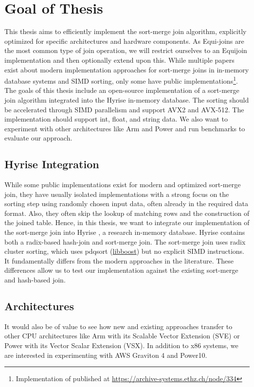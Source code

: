\section{Goal of Thesis}
\label{sec:goal}

This thesis aims to efficiently implement the sort-merge join algorithm, explicitly optimized 
for specific architectures and hardware components. As Equi-joins are the most common type of 
join operation, we will restrict ourselves to an Equijoin implementation and then optionally
extend upon this. While multiple papers exist about modern implementation approaches for
sort-merge joins in in-memory database systems and SIMD sorting, only some have public 
implementations\footnote{Implementation of \cite{Balkesen} published at \url{https://archive-systems.ethz.ch/node/334}}.
The goals of this thesis include an open-source implementation of a sort-merge join algorithm
integrated into the Hyrise in-memory database. The sorting should be accelerated through SIMD
parallelism and support AVX2 and AVX-512. The implementation should support int, float, and string
data. We also want to experiment with other architectures like Arm and Power and run benchmarks 
to evaluate our approach.

\subsection{Hyrise Integration}
While some public implementations
exist for modern and optimized sort-merge join, they have usually isolated implementations with a strong
focus on the sorting step using randomly chosen input data, often already in the required data format. 
Also, they often skip the lookup of matching rows and the construction of the joined table.
Hence, in this thesis, we want to integrate our implementation of the sort-merge join into Hyrise
\cite{DBLP:conf/edbt/DreselerK0KUP19},
a research in-memory database. Hyrise contains both a radix-based hash-join and sort-merge join.
The sort-merge join uses radix cluster sorting, which uses pdqsort (\href{https://www.boost.org/}{libboost})
but no explicit SIMD instructions. It fundamentally differs from the modern approaches in the literature.
These differences allow us to test our implementation against the existing sort-merge and hash-based join.

\subsection{Architectures}
It would also be of value to see how new and existing approaches transfer to other CPU
architectures like Arm with its Scalable Vector Extension (SVE) or Power with its Vector Scalar
Extension (VSX). In addition to x86 systems, we are interested in experimenting with AWS Graviton 4
and Power10.

